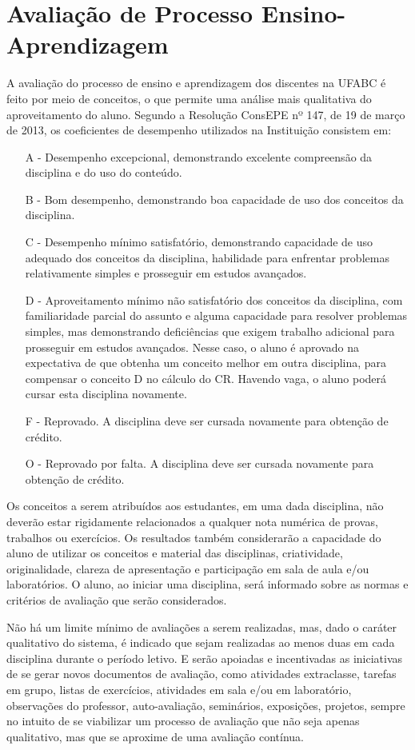 \section {Avaliação de Processo Ensino-Aprendizagem}

A avaliação do processo de ensino e aprendizagem dos discentes na UFABC é feito por
meio de conceitos, o que permite uma análise mais qualitativa do aproveitamento do aluno.
Segundo a Resolução ConsEPE nº 147, de 19 de março de 2013, os coeficientes de
desempenho utilizados na Instituição consistem em:
\begin{itemize}
	\item [A -] Desempenho excepcional, demonstrando excelente compreensão da disciplina e do uso do conteúdo.
	\item [B -] Bom desempenho, demonstrando boa capacidade de uso dos conceitos da disciplina.
	\item [C -] Desempenho mínimo satisfatório, demonstrando capacidade de uso adequado dos conceitos da disciplina, habilidade para enfrentar problemas relativamente simples e prosseguir em estudos avançados.
	\item[D -] Aproveitamento mínimo não satisfatório dos conceitos da disciplina, com familiaridade parcial do assunto e alguma capacidade para resolver problemas simples, mas demonstrando deficiências que exigem trabalho adicional para prosseguir em estudos avançados. Nesse caso, o aluno é aprovado na expectativa de que obtenha um conceito melhor em outra disciplina, para compensar o conceito D no cálculo do CR. Havendo vaga, o aluno poderá cursar esta disciplina novamente.
	\item [F -] Reprovado. A disciplina deve ser cursada novamente para obtenção de crédito.
	\item [O -] Reprovado por falta. A disciplina deve ser cursada novamente para obtenção de crédito.
\end{itemize}

Os conceitos a serem atribuídos aos estudantes, em uma dada disciplina, não deverão
estar rigidamente relacionados a qualquer nota numérica de provas, trabalhos ou exercícios. Os resultados também considerarão a capacidade do aluno de utilizar os conceitos e material das disciplinas, criatividade, originalidade, clareza de apresentação e participação em sala de aula e/ou laboratórios. O aluno, ao iniciar uma disciplina, será informado sobre as normas e critérios de avaliação que serão considerados.


Não há um limite mínimo de avaliações a serem realizadas, mas, dado o caráter qualitativo
do sistema, é indicado que sejam realizadas ao menos duas em cada disciplina durante o
período letivo. E serão apoiadas e incentivadas as iniciativas de se gerar novos documentos de avaliação, como atividades extraclasse, tarefas em grupo, listas de exercícios, atividades em sala e/ou em laboratório, observações do professor, auto-avaliação, seminários, exposições, projetos, sempre no intuito de se viabilizar um processo de avaliação que não seja apenas qualitativo, mas que se aproxime de uma avaliação contínua.


